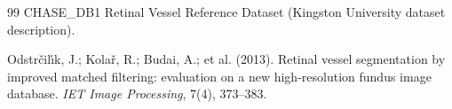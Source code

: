\documentclass[journal,article,submit,pdftex,moreauthors]{Definitions/mdpi}
\begin{document}
\begin{thebibliography}{99}
CHASE\_DB1 Retinal Vessel Reference Dataset (Kingston University dataset description).



Odstr\v{c}il\'{\i}k, J.; Kola\v{r}, R.; Budai, A.; et al. (2013).
Retinal vessel segmentation by improved matched filtering: evaluation on a new high-resolution fundus image database.
\textit{IET Image Processing}, 7(4), 373--383.


\end{thebibliography}

\PublishersNote{}

\end{document}
